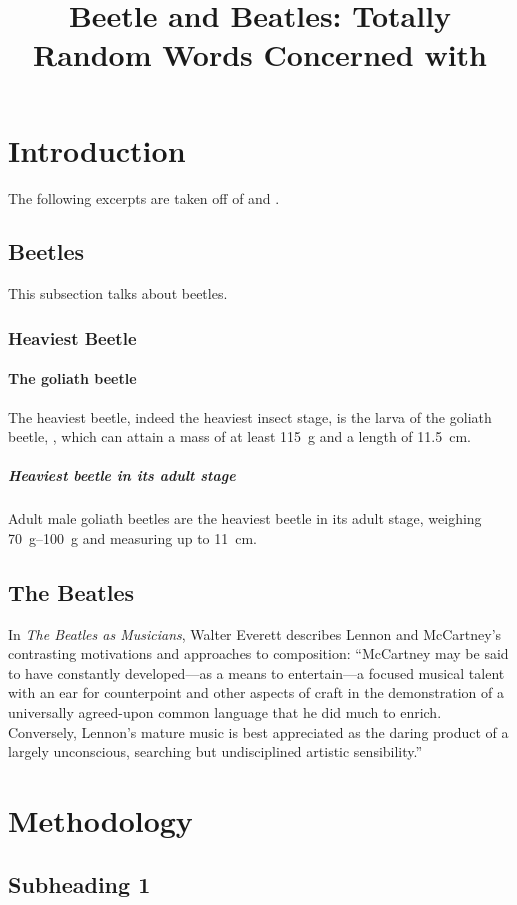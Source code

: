 \documentclass{strrespaper-journ}
\title{Beetle and Beatles: Totally Random Words Concerned with \animal{Gg}}
\affiliation{
	Philippine Science High School -- Cordillera Administrative Region Campus, Purok 12, Irisan,\\
	Baguio City, 2600, Philippines
}
\newcommand{\fillertext}{\lipsum[1][1-5]}
\begin{document}
	\maketitle

	\section{Introduction}
		The following excerpts are taken off of \textcite{Beetle2020} and \textcite{Beatles2020}.
		\subsection{Beetles}
			This subsection talks about beetles.
			\subsubsection{Heaviest Beetle}
				\paragraph{The goliath beetle}
					The heaviest beetle, indeed the heaviest insect stage, is the larva of the goliath beetle, , which can attain a mass of at least \SI{115}{\gram} and a length of \SI{11.5}{\centi\meter}.
					\subparagraph{Heaviest beetle in its adult stage}
						Adult male goliath beetles are the heaviest beetle in its adult stage, weighing \SIrange{70}{100}{\gram} and measuring up to \SI{11}{\centi\meter}.
		\subsection{The Beatles}
			In \textit{The Beatles as Musicians}, Walter Everett describes Lennon and McCartney's contrasting motivations and approaches to composition:
			\enquote{McCartney may be said to have constantly developed---as a means to entertain---a focused musical talent with an ear for counterpoint and other aspects of craft in the demonstration of a universally agreed-upon common language that he did much to enrich.
				Conversely, Lennon's mature music is best appreciated as the daring product of a largely unconscious, searching but undisciplined artistic sensibility.}

	\section{Methodology}
		\subsection{Subheading 1}
			\fillertext
\end{document}
